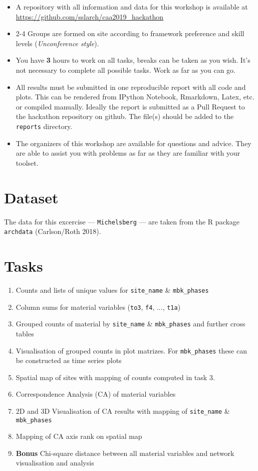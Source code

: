 \documentclass[a3, ruledsections, 8pt]{sciposter}
\begin{document}
\begin{itemize}
\item A repository with all information and data for this workshop is available at \url{https://github.com/sslarch/caa2019_hackathon}
\item 2-4 Groups are formed on site according to framework preference and skill levels (\textit{Unconference style}).
\item You have \textbf{3} hours to work on all tasks, breaks can be taken as you wish. It's not necessary to complete all possible tasks. Work as far as you can go.
\item All results must be submitted in one reproducible report with all code and plots. This can be rendered from IPython Notebook, Rmarkdown, Latex, etc. or compiled manually. Ideally the report is submitted as a Pull Request to the hackathon repository on github. The file(s) should be added to the \verb|reports| directory.
\item The organizers of this workshop are available for questions and advice. They are able to assist you with problems as far as they are familiar with your toolset.
\end{itemize}

\section{Dataset}

The data for this excercise --- \verb|Michelsberg| --- are taken from the R package \verb|archdata| (Carlson/Roth 2018). 

\section{Tasks}

\begin{enumerate}
\item Counts and lists of unique values for \verb|site_name| \& \verb|mbk_phases|
\item Column sums for material variables (\verb|to3|, \verb|f4|, ..., \verb|t1a|)
\item Grouped counts of material by \verb|site_name| \& \verb|mbk_phases| and further cross tables
\item Visualisation of grouped counts in plot matrizes. For \verb|mbk_phases| these can be constructed as time series plots
\item Spatial map of sites with mapping of counts computed in task 3.
\item Correspondence Analysis (CA) of material variables
\item 2D and 3D Visualisation of CA results with mapping of \verb|site_name| \& \verb|mbk_phases|
\item Mapping of CA axis rank on spatial map
\item \textbf{Bonus} Chi-square distance between all material variables and network visualisation and analysis
\end{enumerate}
\end{document}
